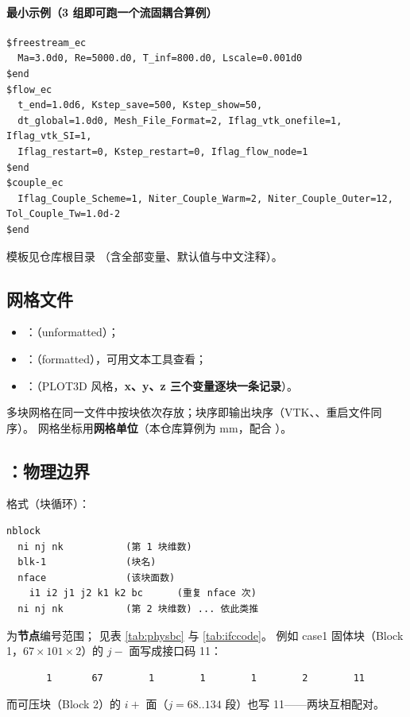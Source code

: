 \paragraph{最小示例（3 组即可跑一个流固耦合算例）}
\begin{lstlisting}
$freestream_ec
  Ma=3.0d0, Re=5000.d0, T_inf=800.d0, Lscale=0.001d0
$end
$flow_ec
  t_end=1.0d6, Kstep_save=500, Kstep_show=50,
  dt_global=1.0d0, Mesh_File_Format=2, Iflag_vtk_onefile=1, Iflag_vtk_SI=1,
  Iflag_restart=0, Kstep_restart=0, Iflag_flow_node=1
$end
$couple_ec
  Iflag_Couple_Scheme=1, Niter_Couple_Warm=2, Niter_Couple_Outer=12, Tol_Couple_Tw=1.0d-2
$end
\end{lstlisting}
模板见仓库根目录 （含全部变量、默认值与中文注释）。



\subsection{网格文件}
\begin{itemize}
  \item {}：（unformatted）；
  \item {}：（formatted），可用文本工具查看；
  \item {}：（PLOT3D 风格，\textbf{x、y、z 三个变量逐块一条记录}）。
\end{itemize}
多块网格在同一文件中按块依次存放；块序即输出块序（VTK、、重启文件同序）。
网格坐标用\textbf{网格单位}（本仓库算例为 mm，配合 ）。

\subsection{：物理边界}
格式（块循环）：
\begin{lstlisting}
nblock
  ni nj nk           (第 1 块维数)
  blk-1              (块名)
  nface              (该块面数)
    i1 i2 j1 j2 k1 k2 bc      (重复 nface 次)
  ni nj nk           (第 2 块维数) ... 依此类推
\end{lstlisting}
 为\textbf{节点}编号范围； 见表 \ref{tab:physbc} 与 \ref{tab:ifccode}。
例如 case1 固体块（Block 1，$67\times101\times2$）的 $j-$ 面写成接口码 11：
\begin{lstlisting}
       1       67        1        1        1        2        11
\end{lstlisting}
而可压块（Block 2）的 $i+$ 面（$j=68..134$ 段）也写 11——两块互相配对。

